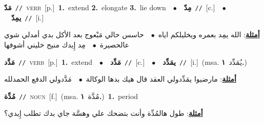 \documentclass[10pt,a4paper,twoside]{article} %
\begin{document}
\begin{multicols}{2}
{\setlength\topsep{0pt}\textbf{\foreignlanguage{arabic}{مَدّ}}\ {\color{gray}\texttt{//}\color{black}}\ \textsc{verb}\ [p.]\ \textbf{1.}~extend  \textbf{2.}~elongate  \textbf{3.}~lie down\ \ $\bullet$\ \ \setlength\topsep{0pt}\textbf{\foreignlanguage{arabic}{مِدّ}}\ {\color{gray}\texttt{//}\color{black}}\ [c.]\ \ $\bullet$\ \ \setlength\topsep{0pt}\textbf{\foreignlanguage{arabic}{يمِدّ}}\ {\color{gray}\texttt{//}\color{black}}\ [i.]\  \begin{flushright}\color{gray}\foreignlanguage{arabic}{\textbf{\underline{\foreignlanguage{arabic}{أمثلة}}}: الله يمِد بعمره ويخليلكم اياه\ $\bullet$\ \  حاسس حالي مَبْعوج بعد الأكل بدي أمدلي شوي عالحصيرة\ $\bullet$\ \  مِد إِيدك منيح خليني أشوفها}\end{flushright}\color{black}} \vspace{2mm}

{\setlength\topsep{0pt}\textbf{\foreignlanguage{arabic}{مَدَّد}}\ {\color{gray}\texttt{//}\color{black}}\ \textsc{verb}\ [p.]\ \textbf{1.}~extend\ \ $\bullet$\ \ \setlength\topsep{0pt}\textbf{\foreignlanguage{arabic}{مَدِّد}}\ {\color{gray}\texttt{//}\color{black}}\ [c.]\ \ $\bullet$\ \ \setlength\topsep{0pt}\textbf{\foreignlanguage{arabic}{يمَدِّد}}\ {\color{gray}\texttt{//}\color{black}}\ [i.]\ \color{gray}(msa. \foreignlanguage{arabic}{يُمَدِّد}~\foreignlanguage{arabic}{\textbf{١.}})\color{black}\  \begin{flushright}\color{gray}\foreignlanguage{arabic}{\textbf{\underline{\foreignlanguage{arabic}{أمثلة}}}: مارضيوا يمَدِّدولي العقد قال هيك بدها الوكالة\ $\bullet$\ \  مَدَّدولي الدفع الحمدلله}\end{flushright}\color{black}} \vspace{2mm}

{\setlength\topsep{0pt}\textbf{\foreignlanguage{arabic}{مُدِّة}}\ {\color{gray}\texttt{//}\color{black}}\ \textsc{noun}\ [f.]\ \color{gray}(msa. \foreignlanguage{arabic}{مُدَّة}~\foreignlanguage{arabic}{\textbf{١.}})\color{black}\ \textbf{1.}~period\  \begin{flushright}\color{gray}\foreignlanguage{arabic}{\textbf{\underline{\foreignlanguage{arabic}{أمثلة}}}: طول هالمُدِّة وأنت بتضحك علي وهسَّة جاي بدك تطلب إِيدي؟}\end{flushright}\color{black}} \vspace{2mm}


\end{multicols}
\end{document}
